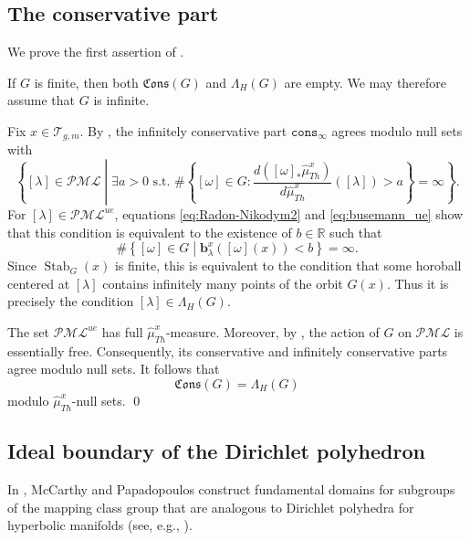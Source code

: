\documentclass[dvipdfmx]{amsart}
\theoremstyle{remark}
\newcommand{\teich}{\mathcal{T}}
\newcommand{\PThursM}{\hat{\mu}_{Th}}
\newcommand{\pml}{\mathcal{PML}}
\newcommand{\busemann}{\boldsymbol{b}}
\newcommand{\conservativepart}{\mathfrak{Cons}}
\begin{document}
\subsection{The conservative part}
\label{subsec:Proof_of_ConservativePart_BigHorospherical}
We prove the first assertion of .

If $G$ is finite, then both $\conservativepart(G)$ and
$\Lambda_H(G)$ are empty. We may therefore assume that $G$ is infinite.

Fix $x\in\teich_{g,m}$. 
By \cite[Theorem~29]{Kaimanovich2010}, the infinitely conservative part $\mathtt{cons}_\infty$ agrees modulo null sets with
\[
\left\{
[\lambda]\in\pml
\mathrel{}\middle|\mathrel{}
\exists a>0\text{ s.t. }
\#\left\{[\omega]\in G:\frac{d([\omega]_*\PThursM^x)}
     {d\PThursM^x}([\lambda])>a\right\}=\infty
\right\}.
\]
For $[\lambda]\in\pml^{ue}$, equations \eqref{eq:Radon-Nikodym2} and \eqref{eq:busemann_ue} show that this condition is equivalent to the existence of $b\in\mathbb{R}$ such that
\[
\#\left\{
[\omega]\in G
\mathrel{}\middle|\mathrel{}
\busemann^x_\lambda([\omega](x))<b
\right\}
=\infty.
\]
Since $\operatorname{Stab}_G(x)$ is finite, this is equivalent to the
condition that some horoball centered at $[\lambda]$ contains infinitely
many points of the orbit $G(x)$. Thus it is precisely the condition
$[\lambda]\in\Lambda_H(G)$.

The set $\pml^{ue}$ has full $\PThursM^x$-measure. Moreover, by
, the action of $G$ on $\pml$ is essentially free.
Consequently, its conservative and infinitely conservative parts agree
modulo null sets. It follows that
\[
\conservativepart(G)=\Lambda_H(G)
\]
modulo $\PThursM^x$-null sets.
\qed

\subsection{Ideal boundary of the Dirichlet polyhedron}
\label{subsec:DirichletDomain_Ideal}
In \cite{McCarthyPapadopoulos1996}, McCarthy and Papadopoulos construct fundamental domains for subgroups of the mapping class group that are analogous to Dirichlet polyhedra for hyperbolic manifolds (see, e.g., \cite{Beardon1995}).
\end{document}
